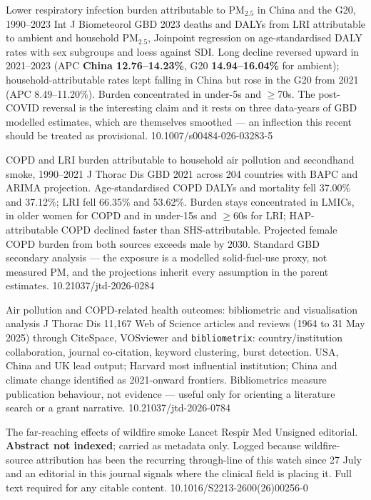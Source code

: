\documentclass[10pt]{article}
\begin{document}
\clearpage


{Lower respiratory infection burden attributable to PM$_{2.5}$ in China and the G20, 1990--2023}
{Int J Biometeorol}
{GBD 2023 deaths and DALYs from LRI attributable to ambient and household PM$_{2.5}$,
Joinpoint regression on age-standardised DALY rates with sex subgroups and loess against
SDI. Long decline reversed upward in 2021--2023 (APC \textbf{China 12.76--14.23\%}, G20
\textbf{14.94--16.04\%} for ambient); household-attributable rates kept falling in China
but rose in the G20 from 2021 (APC 8.49--11.20\%). Burden concentrated in under-5s and
$\geq$70s. The post-COVID reversal is the interesting claim and it rests on three
data-years of GBD modelled estimates, which are themselves smoothed --- an inflection
this recent should be treated as provisional.}
{10.1007/s00484-026-03283-5}

{COPD and LRI burden attributable to household air pollution and secondhand smoke, 1990--2021}
{J Thorac Dis}
{GBD 2021 across 204 countries with BAPC and ARIMA projection. Age-standardised COPD
DALYs and mortality fell 37.00\% and 37.12\%; LRI fell 66.35\% and 53.62\%. Burden stays
concentrated in LMICs, in older women for COPD and in under-15s and $\geq$60s for LRI;
HAP-attributable COPD declined faster than SHS-attributable. Projected female COPD
burden from both sources exceeds male by 2030. Standard GBD secondary analysis --- the
exposure is a modelled solid-fuel-use proxy, not measured PM, and the projections inherit
every assumption in the parent estimates.}
{10.21037/jtd-2026-0284}

{Air pollution and COPD-related health outcomes: bibliometric and visualisation analysis}
{J Thorac Dis}
{11{,}167 Web of Science articles and reviews (1964 to 31 May 2025) through CiteSpace,
VOSviewer and \texttt{bibliometrix}: country/institution collaboration, journal
co-citation, keyword clustering, burst detection. USA, China and UK lead output; Harvard
most influential institution; China and climate change identified as 2021-onward
frontiers. Bibliometrics measure publication behaviour, not evidence --- useful only for
orienting a literature search or a grant narrative.}
{10.21037/jtd-2026-0784}

{The far-reaching effects of wildfire smoke}
{Lancet Respir Med}
{Unsigned editorial. \textbf{Abstract not indexed}; carried as metadata only. Logged
because wildfire-source attribution has been the recurring through-line of this watch
since 27 July and an editorial in this journal signals where the clinical field is
placing it. Full text required for any citable content.}
{10.1016/S2213-2600(26)00256-0}
\end{document}
